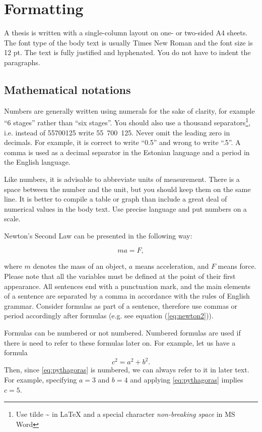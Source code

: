\section{Formatting}  

A thesis is written with a single-column layout on one- or two-sided
A4 sheets. The font type of the body text is usually Times New Roman 
and the font size is 12 pt. The text is fully justified and hyphenated.
You do not have to indent the paragraphs.

\subsection{Mathematical notations}

Numbers are generally written using numerals for the sake of clarity,
for example ``6 stages'' rather than ``six stages''. You should
also use a thousand separators\footnote{Use tilde \~{} in LaTeX and a
  special character \textit{non-breaking space} in MS Word},
i.e. instead of 55700125 write 55~700~125. Never omit the leading zero
in decimals. For example, it is correct to write ``0.5'' and wrong to
write ``.5''. A comma is used as a decimal separator in the Estonian
language and a period in the English language.

Like numbers, it is advisable to abbreviate units of
measurement. There is a space between the number and the unit, but you
should keep them on the same line. It is better to compile a table or
graph than include a great deal of numerical values in the body
text. Use precise language and put numbers on a scale.

Newton's Second Law can be presented in the following way:

\begin{equation}
  \label{eq:newton2}
 ma= F,
\end{equation}

where $m$ denotes the mass of an object, $a$ means acceleration, and
$F$ means force. Please note that all the variables must be defined at
the point of their first appearance. All sentences end with a
punctuation mark, and the main elements of a sentence are separated by
a comma in accordance with the rules of English grammar. Consider formulas 
as part of a sentence, therefore use commas or period accordingly after 
formulas (e.g. see equation (\ref{eq:newton2})).

Formulas can be numbered or not numbered. Numbered formulas are used if there is need to refer to these formulas later on. For example, let us have a formula
\begin{equation}\label{eq:pythagoras}
c^2=a^2+b^2.
\end{equation}
Then, since \eqref{eq:pythagoras} is numbered, we can always refer to it in later text. For example, specifying $a=3$ and $b=4$ and applying \eqref{eq:pythagoras} implies $c=5$.

